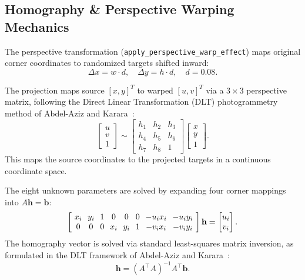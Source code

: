 \documentclass[11pt,twocolumn]{article}
\begin{document}
\subsection{Homography \& Perspective Warping Mechanics}\label{sec:homography}

The perspective transformation (\texttt{apply\_perspective\_warp\_effect}) maps original corner coordinates to randomized targets shifted inward:
\begin{equation}\label{eq:distortion}
  \Delta x = w \cdot d,\quad \Delta y = h \cdot d,\quad d = 0.08.
\end{equation}

The projection maps source $[x,y]^T$ to warped $[u,v]^T$ via a $3\!\times\!3$ perspective matrix, following the Direct Linear Transformation (DLT) photogrammetry method of Abdel-Aziz and Karara~\cite{abdelaziz1971direct}:
\begin{equation}\label{eq:proj_mat}
  \begin{bmatrix} u \\ v \\ 1\end{bmatrix} \sim
  \begin{bmatrix} h_1 & h_2 & h_3 \\ h_4 & h_5 & h_6 \\ h_7 & h_8 & 1\end{bmatrix}
  \begin{bmatrix} x \\ y \\ 1\end{bmatrix}.
\end{equation}
This maps the source coordinates to the projected targets in a continuous coordinate space.

The eight unknown parameters are solved by expanding four corner mappings into $A\mathbf{h} = \mathbf{b}$:
\begin{equation}\label{eq:homography_system}
  \left[\setlength{\arraycolsep}{3.5pt}\begin{array}{cccccccc}
    x_i & y_i & 1 & 0 & 0 & 0 & -u_i x_i & -u_i y_i\\
    0 & 0 & 0 & x_i & y_i & 1 & -v_i x_i & -v_i y_i
  \end{array}\right]
  \mathbf{h} = \begin{bmatrix} u_i \\ v_i\end{bmatrix}.
\end{equation}
The homography vector is solved via standard least-squares matrix inversion, as formulated in the DLT framework of Abdel-Aziz and Karara~\cite{abdelaziz1971direct}:
\begin{equation}\label{eq:ls_solve}
  \mathbf{h} = (A^\top A)^{-1} A^\top \mathbf{b}.
\end{equation}
\end{document}
